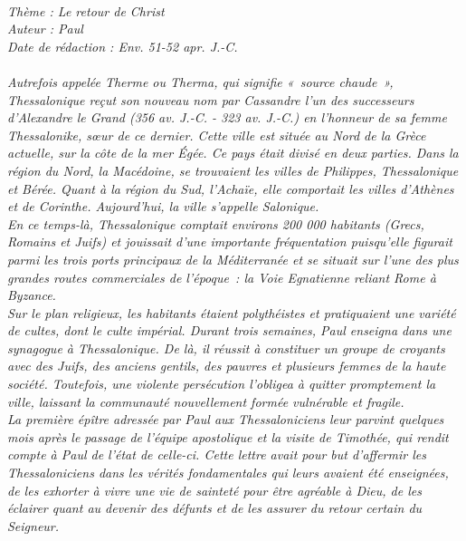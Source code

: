 \BFont
\noindent\hrulefill
\textit{
\bigskip
{\centering{}
\\Thème : Le retour de Christ
\\Auteur : Paul
\\Date de rédaction : Env. 51-52 apr. J.-C.\\}
}
\textit{
\\Autrefois appelée Therme ou Therma, qui signifie « source chaude », Thessalonique reçut son nouveau nom par  Cassandre l’un des successeurs  d’Alexandre le Grand (356 av. J.-C. - 323 av. J.-C.) en l’honneur de sa femme Thessalonike, sœur  de ce dernier. Cette ville est située au Nord de la Grèce actuelle, sur la côte de la mer Égée. Ce pays était divisé en deux parties. Dans la région du Nord, la Macédoine, se trouvaient les villes de Philippes, Thessalonique et Bérée. Quant à la région du Sud, l’Achaïe, elle comportait les villes d’Athènes et de Corinthe. Aujourd’hui, la ville s’appelle Salonique.
\bigskip
\\En ce temps-là, Thessalonique comptait environs 200 000 habitants (Grecs, Romains et Juifs) et jouissait d’une importante fréquentation puisqu’elle figurait parmi les trois ports principaux de la Méditerranée et se situait sur l’une des plus grandes routes commerciales de l’époque : la Voie Egnatienne reliant Rome à Byzance.
\bigskip
\\Sur le plan religieux, les habitants étaient polythéistes et pratiquaient une variété de cultes, dont le culte impérial. Durant trois semaines, Paul enseigna dans une synagogue à Thessalonique. De là, il réussit à constituer un groupe de croyants avec  des Juifs,  des anciens gentils, des pauvres et plusieurs femmes de la haute société. Toutefois, une violente persécution l’obligea à quitter promptement la ville, laissant la communauté nouvellement formée vulnérable et fragile.
\bigskip
\\La première épître adressée par Paul aux Thessaloniciens leur parvint quelques mois après le passage de l’équipe apostolique et la visite de Timothée, qui rendit compte à Paul de l’état de celle-ci. Cette lettre avait pour but d’affermir les Thessaloniciens dans les vérités fondamentales qui leurs avaient été enseignées, de les exhorter à vivre une vie de sainteté pour être agréable à Dieu, de les éclairer quant au devenir des défunts et de les assurer du retour certain du Seigneur.\bigskip
}
\par\nobreak\noindent\hrulefill
